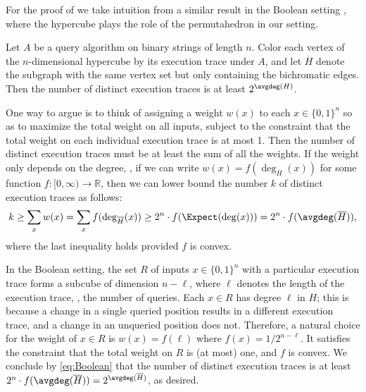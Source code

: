 For the proof of  we take intuition from a similar result in the Boolean setting \cite[Exercise~8.43]{ODonnell2014}, where the hypercube plays the role of the permutahedron in our setting.
\begin{fact}\label{fact:Boolean} 
Let $A$ be a query algorithm on binary strings of length $n$. Color each vertex of the $n$-dimensional hypercube by its execution trace under $A$, and let $\overline{H}$ denote the subgraph with the same vertex set but only containing the bichromatic edges. Then the number of distinct execution traces is at least $2^{\avgdeg(H)}$.
\end{fact}

One way to argue  is to think of assigning a weight $w(x)$ to each $x \in \{0,1\}^n$ so as to maximize the total weight on all inputs, subject to the constraint that the total weight on each individual execution trace is at most 1. Then the number of distinct execution traces must be at least the sum of all the weights. If the weight only depends on the degree, \ie, if we can write $w(x) = f(\deg_{\overline{H}}(x))$ for some function $f: [0,\infty) \to \mathbb{R}$, then we can lower bound the number $k$ of distinct execution traces as follows:
\begin{equation}\label{eq:Boolean}
k \ge \sum_x w(x) = \sum_x f(\deg_{\overline{H}}(x)) \ge 2^n \cdot f(\Expect(\deg(x))) = 2^n \cdot f(\avgdeg(\overline{H})),
\end{equation}
where the last inequality holds provided $f$ is convex. 

In the Boolean setting, the set $R$ of inputs $x \in \{0,1\}^n$ with a particular execution trace forms a subcube of dimension $n-\ell$, where $\ell$ denotes the length of the execution trace, \ie, the number of queries. Each $x \in R$ has degree $\ell$ in $H$; this is because a change in a single queried position results in a different execution trace, and a change in an unqueried position does not. Therefore, a natural choice for the weight of $x \in R$ is $w(x) = f(\ell)$ where $f(x) = 1/2^{n-\ell}$. It satisfies the constraint that the total weight on $R$ is (at most) one, and $f$ is convex. We conclude by \eqref{eq:Boolean} that the number of distinct execution traces is at least $2^n \cdot f(\avgdeg(\overline{H})) = 2^{\avgdeg(\overline{H})}$, as desired.

